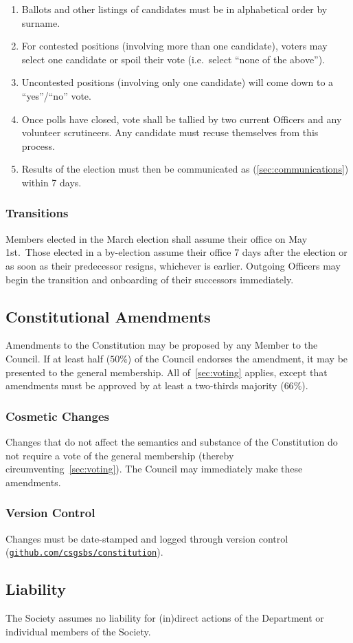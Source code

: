 \begin{enumerate}
      \item Ballots and other listings of candidates must be in alphabetical order by
            surname.
      \item For contested positions (involving more than one candidate), voters may select
            one candidate or spoil their vote (i.e.\ select ``none of the above'').
      \item Uncontested positions (involving only one candidate) will come down to a
            ``yes''/``no'' vote.
      \item Once polls have closed, vote shall be tallied by two current Officers and any
            volunteer scrutineers. Any candidate must recuse themselves from this process.
      \item Results of the election must then be communicated as (\ref{sec:communications})
            within 7 days.
\end{enumerate}

\subsubsection{Transitions}
Members elected in the March election shall assume their office on May 1st.\
Those elected in a by-election assume their office 7 days after the election or
as soon as their predecessor resigns, whichever is earlier. Outgoing Officers
may begin the transition and onboarding of their successors immediately.

\subsection{Constitutional Amendments}
Amendments to the Constitution may be proposed by any Member to the Council. If
at least half ($50\%$) of the Council endorses the amendment, it may be
presented to the general membership. All of~\ref{sec:voting} applies, except
that amendments must be approved by at least a two-thirds majority ($66\%$).

\subsubsection{Cosmetic Changes}
Changes that do not affect the semantics and substance of the Constitution do
not require a vote of the general membership (thereby
circumventing~\ref{sec:voting}). The Council may immediately make these
amendments.

\subsubsection{Version Control}
Changes must be date-stamped and logged through version control
(\href{https://github.com/csgsbs/constitution}{\texttt{github.com/csgsbs/constitution}}).

\subsection{Liability}
The Society assumes no liability for (in)direct actions of the Department or
individual members of the Society.